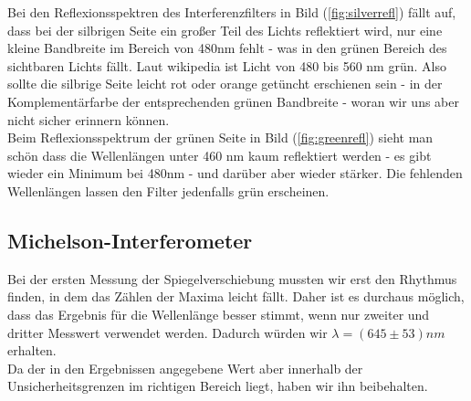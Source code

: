 \documentclass{article}
\begin{document}
Bei den Reflexionsspektren des Interferenzfilters in Bild (\ref{fig:silverrefl}) fällt auf, dass bei der silbrigen Seite ein großer Teil des Lichts reflektiert wird, nur eine kleine Bandbreite im Bereich von 480nm fehlt - was in den grünen Bereich des sichtbaren Lichts fällt. Laut wikipedia ist Licht von 480 bis 560 nm grün. Also sollte die silbrige Seite leicht rot oder orange getüncht erschienen sein - in der Komplementärfarbe der entsprechenden grünen Bandbreite - woran wir uns aber nicht sicher erinnern können. \\
Beim Reflexionsspektrum der grünen Seite in Bild (\ref{fig:greenrefl}) sieht man schön dass die Wellenlängen unter 460 nm kaum reflektiert werden - es gibt wieder ein Minimum bei 480nm - und darüber aber wieder stärker. Die fehlenden Wellenlängen lassen den Filter jedenfalls grün erscheinen.
\subsection{Michelson-Interferometer}
Bei der ersten Messung der Spiegelverschiebung mussten wir erst den Rhythmus finden, in dem das Zählen der Maxima leicht fällt. Daher ist es durchaus möglich, dass das Ergebnis für die Wellenlänge besser stimmt, wenn nur zweiter und dritter Messwert verwendet werden. Dadurch würden wir $\lambda=(645 \pm 53)nm$ erhalten.\\
Da der in den Ergebnissen angegebene Wert aber innerhalb der Unsicherheitsgrenzen im richtigen Bereich liegt, haben wir ihn beibehalten.
																								
\end{document}
